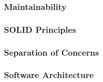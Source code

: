 \subsubsection{Maintainability}


\subsubsection{SOLID Principles}
\label{section:SOLID}


\subsubsection{Separation of Concerns}


\subsubsection{Software Architecture}
